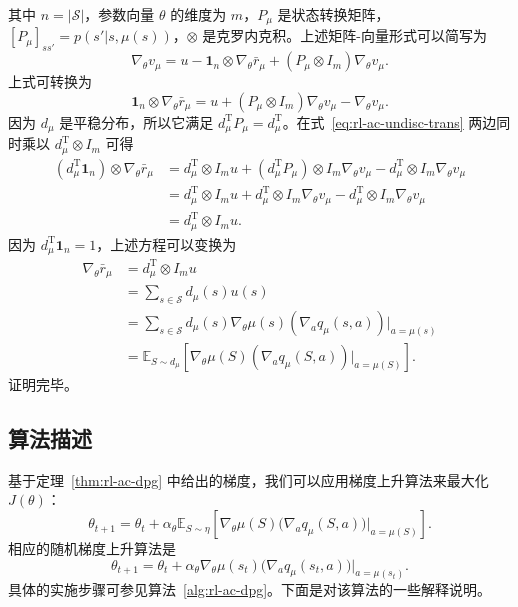 \begin{derivation}
\[\]
其中 $n = |\mathcal{S}|$，参数向量 $\theta$ 的维度为 $m$，$P_{\mu}$ 是状态转换矩阵，$[P_{\mu}]_{ss'} = p(s' | s, \mu(s))$，$\otimes$ 是克罗内克积。上述矩阵-向量形式可以简写为
\[
\nabla_{\theta} v_{\mu} = u - \mathbf{1}_{n} \otimes \nabla_{\theta} \bar{r}_{\mu} + (P_{\mu} \otimes I_{m}) \nabla_{\theta} v_{\mu}.
\]
上式可转换为
\begin{equation}
\mathbf{1}_{n} \otimes \nabla_{\theta} \bar{r}_{\mu} = u + (P_{\mu} \otimes I_{m}) \nabla_{\theta} v_{\mu} - \nabla_{\theta} v_{\mu}.
\label{eq:rl-ac-undisc-trans}
\end{equation}
因为 $d_{\mu}$ 是平稳分布，所以它满足 $d_{\mu}^{\mathrm{T}} P_{\mu} = d_{\mu}^{\mathrm{T}}$。在式~\eqref{eq:rl-ac-undisc-trans} 两边同时乘以 $d_{\mu}^{\mathrm{T}} \otimes I_{m}$ 可得
\[
\begin{aligned}
(d_{\mu}^{\mathrm{T}} \mathbf{1}_{n}) \otimes \nabla_{\theta} \bar{r}_{\mu}
&= d_{\mu}^{\mathrm{T}} \otimes I_{m} u + (d_{\mu}^{\mathrm{T}} P_{\mu}) \otimes I_{m} \nabla_{\theta} v_{\mu} - d_{\mu}^{\mathrm{T}} \otimes I_{m} \nabla_{\theta} v_{\mu} \\
&= d_{\mu}^{\mathrm{T}} \otimes I_{m} u + d_{\mu}^{\mathrm{T}} \otimes I_{m} \nabla_{\theta} v_{\mu} - d_{\mu}^{\mathrm{T}} \otimes I_{m} \nabla_{\theta} v_{\mu} \\
&= d_{\mu}^{\mathrm{T}} \otimes I_{m} u.
\end{aligned}
\]
因为 $d_{\mu}^{\mathrm{T}} \mathbf{1}_{n} = 1$，上述方程可以变换为
\[
\begin{aligned}
\nabla_{\theta} \bar{r}_{\mu} &= d_{\mu}^{\mathrm{T}} \otimes I_{m} u \\
&= \sum_{s \in \mathcal{S}} d_{\mu}(s) u(s) \\
&= \sum_{s \in \mathcal{S}} d_{\mu}(s) \nabla_{\theta} \mu(s) (\nabla_{a} q_{\mu}(s, a)) |_{a = \mu(s)} \\
&= \mathbb{E}_{S \sim d_{\mu}}[\nabla_{\theta} \mu(S) (\nabla_{a} q_{\mu}(S, a)) |_{a = \mu(S)}].
\end{aligned}
\]
证明完毕。
\end{derivation}

\subsection{算法描述}
\label{sec:rl-ac-dpg-alg}

基于定理~\ref{thm:rl-ac-dpg} 中给出的梯度，我们可以应用梯度上升算法来最大化 $J(\theta)$：
\[
\theta_{t+1} = \theta_{t} + \alpha_{\theta} \mathbb{E}_{S \sim \eta} \left[ \nabla_{\theta} \mu(S) \big( \nabla_{a} q_{\mu}(S, a) \big) |_{a = \mu(S)} \right].
\]
相应的随机梯度上升算法是
\[
\theta_{t+1} = \theta_{t} + \alpha_{\theta} \nabla_{\theta} \mu(s_{t}) \big( \nabla_{a} q_{\mu}(s_{t}, a) \big) |_{a = \mu(s_{t})}.
\]
具体的实施步骤可参见算法~\ref{alg:rl-ac-dpg}。下面是对该算法的一些解释说明。

